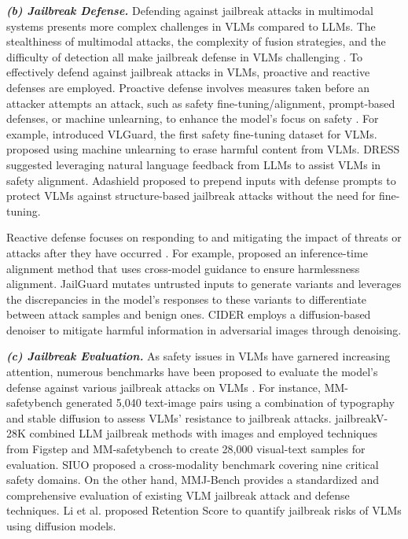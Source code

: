 \textbf{\textit{(b) Jailbreak Defense.}}
Defending against jailbreak attacks in multimodal systems presents more complex challenges in VLMs compared to LLMs. The stealthiness of multimodal attacks, the complexity of fusion strategies, and the difficulty of detection all make jailbreak defense in VLMs challenging \cite{gong2023figstep, shayegani2023jailbreak}. To effectively defend against jailbreak attacks in VLMs, proactive and reactive defenses are employed. Proactive defense involves measures taken before an attacker attempts an attack, such as safety fine-tuning/alignment, prompt-based defenses, or machine unlearning, to enhance the model's focus on safety \cite{zong2024safety, chakraborty2024cross, chen2024dress, weng2024textit, wang2024adashield, zhang2024spa, liu2024safety, wang2024cross}. For example, \cite{zong2024safety} introduced VLGuard, the first safety fine-tuning dataset for VLMs. \cite{chakraborty2024cross} proposed using machine unlearning to erase harmful content from VLMs. DRESS \cite{chen2024dress} suggested leveraging natural language feedback from LLMs to assist VLMs in safety alignment. Adashield \cite{wang2024adashield} proposed to prepend inputs with defense prompts to protect VLMs against structure-based jailbreak attacks without the need for fine-tuning.

Reactive defense focuses on responding to and mitigating the impact of threats or attacks after they have occurred \cite{wang2024inferaligner, xu2024defending, zhang2023mutation}. For example, \cite{wang2024inferaligner} proposed an inference-time alignment method that uses cross-model guidance to ensure harmlessness alignment. JailGuard  \cite{zhang2023mutation} mutates untrusted inputs to generate variants and leverages the discrepancies in the model's responses to these variants to differentiate between attack samples and benign ones. CIDER \cite{xu2024defending} employs a diffusion-based denoiser to mitigate harmful information in adversarial images through denoising.

\textbf{\textit{(c) Jailbreak Evaluation.}}
As safety issues in VLMs have garnered increasing attention, numerous benchmarks have been proposed to evaluate the model's defense against various jailbreak attacks on VLMs \cite{luo2024jailbreakv, wang2024cross, liu2024mmsafetybenchbenchmarksafetyevaluation, weng2024textit, zhang2024spa, zhang2024benchmarkingtrustworthinessmultimodallarge}. For instance, MM-safetybench \cite{liu2024mmsafetybenchbenchmarksafetyevaluation} generated 5,040 text-image pairs using a combination of typography and stable diffusion to assess VLMs' resistance to jailbreak attacks. jailbreakV-28K \cite{luo2024jailbreakv} combined LLM jailbreak methods with images and employed techniques from Figstep \cite{gong2023figstep} and MM-safetybench \cite{liu2024mmsafetybenchbenchmarksafetyevaluation} to create 28,000 visual-text samples for evaluation. SIUO \cite{wang2024cross} proposed a cross-modality benchmark covering nine critical safety domains. On the other hand, MMJ-Bench \cite{weng2024textit} provides a standardized and comprehensive evaluation of existing VLM jailbreak attack and defense techniques. Li et al. proposed Retention Score \cite{li2024retention} to quantify jailbreak risks of VLMs using diffusion models.


